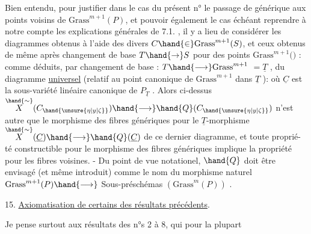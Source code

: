 
Bien entendu, pour justifier dans le cas  du présent n° le passage
de \hand{$\eta$} générique aux points voisins de $\mathrm{Grass}^{m+1}(P)$, et pouvoir également
le cas échéant reprendre à notre compte les explications générales de
7.1. , il y a lieu de considérer les diagrammes
obtenus à l'aide des divers $C \hand{\in} \mathrm{Grass}^{m+1}(S)$, et  ceux obtenus de même
après changement de base $T \hand{\to} S$ pour des points \hand{$\unsure{\xi|\zeta}$} \hand{$\in$} $\mathrm{Grass}^{m+1}($$)$ :
\diagram{\[\begin{array}{ccc}
X_T & \hand{\longleftarrow} & \overset{\hand{\sim}}{X}(C_{\hand{\unsure{\xi|\zeta}}}) = \overset{\hand{\sim}}{X}_T(C_{\hand{\unsure{\xi|\zeta}}}) \\
\hand{\downarrow} & & \hand{\downarrow} \\
T & \hand{\longleftarrow} & \hand{Q}(C_{\hand{\unsure{\xi|\zeta}}})
\end{array}\]}
comme déduits, par changement de base \hand{$\unsure{\xi|\zeta}$} : $T \hand{\longrightarrow} \mathrm{Grass}^{m+1}$ $= \underline{T}$ ,
du diagramme \uline{universel} (relatif au point canonique de $\mathrm{Grass}^{m+1}$ dans $\underline{T}$ ):
où $\underline{C}$ est la sous-variété linéaire canonique de $P_{\underline{T}}$ . Alors ci-dessus
$\overset{\hand{\sim}}{X}(C_{\hand{\unsure{\eta|y|\zeta}}}) \hand{\longrightarrow} \hand{Q}(C_{\hand{\unsure{\eta|y|\zeta}}})$ n'est autre que le morphisme des fibres génériques pour
le $\underline{T}$-morphisme $\overset{\hand{\sim}}{X}(\underline{C}) \hand{\longrightarrow} \hand{Q}(\underline{C})$ de ce dernier diagramme, et toute propri\'e-%
té constructible pour  le morphisme des fibres génériques implique
la propriété pour les fibres voisines. - Du point de vue notationel,
$\hand{Q}$ doit être envisagé (et même introduit) comme le nom du morphisme 
naturel $\mathrm{Grass}^{m+1}(P) \hand{\longrightarrow}$  Sous-préschémas $(\mathrm{Grass}^{m}(P))$ .

15. \uline{Axiomatisation de certains des résultats précédents}.

Je pense surtout aux résultats des n°s 2 à 8, qui pour la plupart

